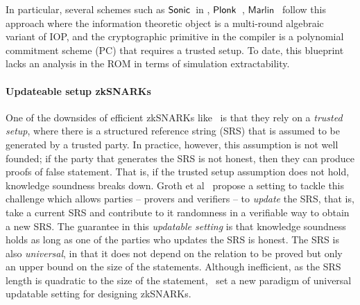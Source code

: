 %

In particular, several schemes such as
${\textnormal{\textsf{Sonic}}}$~in \cite{CCS:MBKM19}, $\textnormal{\textsf{Plonk}}$~\cite{EPRINT:GabWilCio19}, $\textsf{Marlin}$~\cite{EC:CHMMVW20} 
follow this approach where the information theoretic object is a multi-round algebraic variant of IOP, and the cryptographic primitive in the compiler is a polynomial commitment scheme (PC) that requires a trusted setup. To date, this blueprint lacks an analysis in the ROM in terms of simulation extractability.


\paragraph{Updateable setup zkSNARKs}
One of the downsides of efficient zkSNARKs like~\cite{AC:Groth10a,TCC:Lipmaa12,EC:GGPR13,SP:PHGR13,AC:Lipmaa13,AC:DFGK14,EC:Groth16} is that they rely on a \textit{trusted setup}, where there is a structured reference string (SRS) that is assumed to be generated by a trusted party. In practice, however, this assumption is not well founded; if the party that generates the SRS is not honest, then they can produce proofs of false statement. That is, if the trusted setup assumption does not hold, knowledge soundness breaks down.
Groth et al~\cite{C:GKMMM18} propose a setting to tackle this challenge which allows parties -- provers and verifiers -- to \emph{update} the SRS, that is, take a current SRS and contribute to it randomness in a verifiable way to obtain a new SRS. The guarantee in this \textit{updatable setting} is that knowledge soundness holds as long as one of the parties who updates the SRS is honest. The SRS is also \emph{universal}, in that it does not depend on the relation to be proved but only an upper bound on the size of the statements.
Although inefficient, as the SRS length is quadratic to the size of the statement,~\cite{C:GKMMM18} set a new
paradigm of universal updatable setting for designing zkSNARKs.

